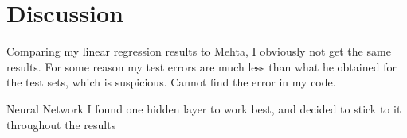 \section{Discussion} \label{sec:discussion}
Comparing my linear regression results to Mehta, I obviously not get the same results. For some reason my test errors are much less than what he obtained for the test sets, which is suspicious. Cannot find the error in my code. 

Neural Network
I found one hidden layer to work best, and decided to stick to it throughout the results